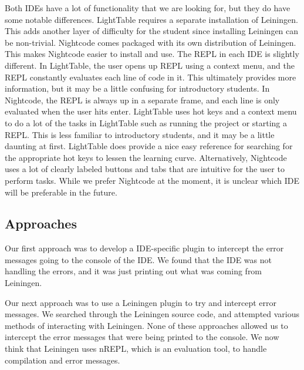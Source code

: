 \documentclass[12pt]{article}
\newcommand{\comment}[1]{{\bf \tt  {#1}}}
\newcommand{\emcomment}[1]{\textcolor{ForestGreen}{\comment{Elena: {#1}}}}
\newcommand{\mmcomment}[1]{\textcolor{magenta}{\comment{Max: {#1}}}}
\begin{document}
Both IDEs have a lot of functionality that we are looking for, but they do have some notable differences. LightTable %
requires a separate installation of Leiningen. %
This adds another layer of difficulty for the student since installing Leiningen can be non-trivial. Nightcode comes packaged with its own distribution of Leiningen. This makes Nightcode easier to install and use. The REPL in each IDE is slightly different. In LightTable, the user opens up REPL
using a context menu, and the REPL constantly evaluates each line of code in it. This ultimately provides more information, but it may be a little confusing for introductory students. In Nightcode, the REPL is always up in a
separate frame, and each line is only evaluated when the user hits enter. LightTable uses hot keys and a context menu to do a lot of the tasks in LightTable such as running the project or starting a REPL. This is less
familiar to introductory students, and it may be a little daunting at first. LightTable does provide a nice easy reference for searching for the appropriate hot keys to lessen the learning curve. Alternatively, Nightcode uses a lot of clearly labeled buttons and tabs that are intuitive for the user
to perform tasks. While we prefer Nightcode at the moment, it is unclear which IDE will be preferable in the future.

\subsection{Approaches}\label{sec:approach}

Our first approach was to develop a IDE-specific plugin to intercept the error messages going to the console of the IDE. We found that the IDE was not handling the errors, and it was just printing out what was coming from Leiningen.

Our next approach was to use a Leiningen plugin to try and intercept error messages. We searched through the Leiningen source code, and attempted various methods of interacting with Leiningen. None of these approaches allowed us to intercept the error messages that were being printed to the console. We now think that Leiningen uses nREPL, which is an evaluation tool, to handle compilation and error messages.
\end{document}
